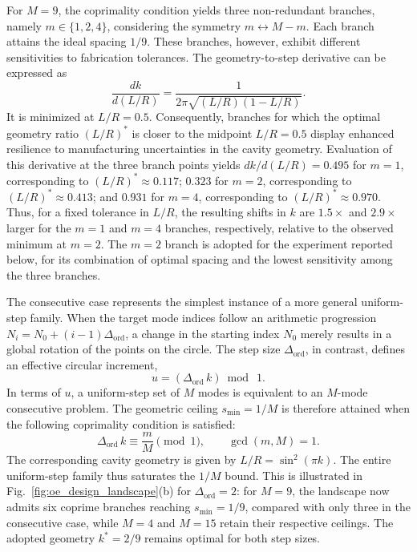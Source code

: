 \documentclass{optica-article}
\begin{document}
For $M=9$, the coprimality condition yields three non-redundant branches, namely $m\in\{1,2,4\}$, considering the symmetry $m\leftrightarrow M{-}m$. Each branch attains the ideal spacing $1/9$. These branches, however, exhibit different sensitivities to fabrication tolerances. The geometry-to-step derivative can be expressed as
\[
\frac{dk}{d(L/R)}=\frac{1}{2\pi\sqrt{(L/R)(1-L/R)}}.
\]
It is minimized at $L/R=0.5$. Consequently, branches for which the optimal geometry ratio $(L/R)^*$ is closer to the midpoint $L/R=0.5$ display enhanced resilience to manufacturing uncertainties in the cavity geometry. Evaluation of this derivative at the three branch points yields $dk/d(L/R)=0.495$ for $m=1$, corresponding to $(L/R)^*\approx0.117$; $0.323$ for $m=2$, corresponding to $(L/R)^*\approx0.413$; and $0.931$ for $m=4$, corresponding to $(L/R)^*\approx0.970$. Thus, for a fixed tolerance in $L/R$, the resulting shifts in $k$ are $1.5\times$ and $2.9\times$ larger for the $m=1$ and $m=4$ branches, respectively, relative to the observed minimum at $m=2$. The $m=2$ branch is adopted for the experiment reported below, for its combination of optimal spacing and the lowest sensitivity among the three branches.

The consecutive case represents the simplest instance of a more general uniform-step family. When the target mode indices follow an arithmetic progression $N_i=N_0+(i-1)\Delta_{\mathrm{ord}}$, a change in the starting index $N_0$ merely results in a global rotation of the points on the circle. The step size $\Delta_{\mathrm{ord}}$, in contrast, defines an effective circular increment,
\begin{equation}
u=(\Delta_{\mathrm{ord}}\,k)\bmod~1.
\label{eq:oe_u_def}
\end{equation}
In terms of $u$, a uniform-step set of $M$ modes is equivalent to an $M$-mode consecutive problem. The geometric ceiling $s_{\min}=1/M$ is therefore attained when the following coprimality condition is satisfied:
\begin{equation}
\Delta_{\mathrm{ord}}\,k \equiv \frac{m}{M}\pmod{1},\qquad \gcd(m,M)=1.
\label{eq:oe_uniform_condition}
\end{equation}
The corresponding cavity geometry is given by $L/R=\sin^2(\pi k)$. The entire uniform-step family thus saturates the $1/M$ bound. This is illustrated in Fig.~\ref{fig:oe_design_landscape}(b) for $\Delta_{\mathrm{ord}}=2$: for $M=9$, the landscape now admits six coprime branches reaching $s_{\min}=1/9$, compared with only three in the consecutive case, while $M=4$ and $M=15$ retain their respective ceilings. The adopted geometry $k^*=2/9$ remains optimal for both step sizes.
\end{document}
